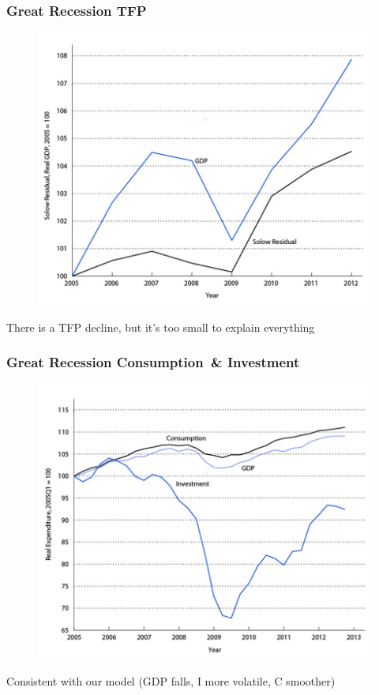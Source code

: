 \documentclass{beamer}
\begin{document}
\begin{frame}
\frametitle[alignment=center]{Great Recession TFP}
\begin{figure}
\centering
\includegraphics[scale=0.65]{Figures/W_Fig_13pt13.png}
\end{figure}
There is a TFP decline, but it's too small to explain everything
\end{frame}

\begin{frame}
\frametitle[alignment=center]{Great Recession Consumption\ & Investment}
\begin{figure}
\centering
\includegraphics[scale=0.65]{Figures/W_Fig_13pt14.png}
\end{figure}
Consistent with our model (GDP falls, I more volatile, C smoother)
\end{frame}
\end{document}
